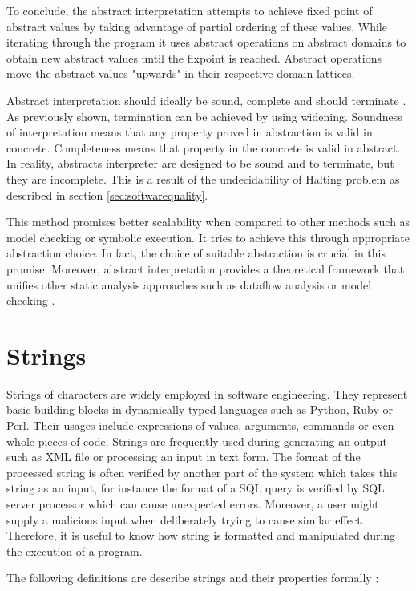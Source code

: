 \documentclass[12pt,final,oneside]{fithesis2}
\theoremstyle{definition}
\begin{document}
To conclude, the abstract interpretation attempts to achieve fixed point of
abstract values by taking advantage of partial ordering of these values.
While iterating through the program it uses abstract operations on abstract
domains to obtain new abstract values until the fixpoint is reached.
Abstract operations move the abstract values "upwards" in their respective
domain lattices.

Abstract interpretation should ideally be sound, complete and should
terminate \cite{aiaa10}. As previously shown, termination can be achieved by
using widening. Soundness of interpretation means that any property proved
in abstraction is valid in concrete. Completeness means that property in
the concrete is valid in abstract. In reality, abstracts interpreter are
designed to be sound and to terminate, but they are incomplete. This is
a result of the undecidability of Halting problem as described in
section \ref{sec:softwarequality}.

This method promises better scalability when compared to other
methods such as model checking or symbolic execution. It tries to achieve
this through appropriate abstraction choice. In fact, the choice of suitable
abstraction is crucial in this promise. Moreover, abstract interpretation
provides a theoretical framework that unifies other static analysis
approaches such as dataflow analysis \cite{CousotCousot77-1} or model
checking \cite{CousotCousot99-1}.


\section{Strings}
\label{sec:strings}

Strings of characters are widely employed in software engineering. They
represent basic building blocks in dynamically typed languages such as
Python, Ruby or Perl. Their usages include expressions of values,
arguments, commands or even whole pieces of code. Strings are frequently
used during generating an output such as XML file or processing an input
in text form. The format of the processed string is often verified by
another part of the system which takes this string as an input, for
instance the format of a SQL query is verified by SQL server processor
which can cause unexpected errors. Moreover, a user might supply a
malicious input when deliberately trying to cause similar effect.
Therefore, it is useful to know how string is formatted and manipulated
during the execution of a program.

The following definitions are describe strings and their properties
formally \cite{Kozen97-1}:
\end{document}
